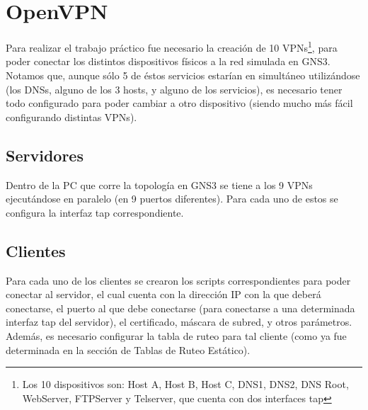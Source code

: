 \section{OpenVPN}
Para realizar el trabajo práctico fue necesario la creación de 10 VPNs\footnote{Los 10 dispositivos son: Host A, Host B, Host C, DNS1, DNS2, DNS Root, WebServer, FTPServer y Telserver, que cuenta con dos interfaces tap}, para poder conectar los distintos dispositivos físicos a la red simulada en GNS3. Notamos que, aunque sólo 5 de éstos servicios estarían en simultáneo utilizándose (los DNSs, alguno de los 3 hosts, y alguno de los servicios), es necesario tener todo configurado para poder cambiar a otro dispositivo (siendo mucho más fácil configurando distintas VPNs).

\subsection{Servidores}
Dentro de la PC que corre la topología en GNS3 se tiene a los 9 VPNs ejecutándose en paralelo (en 9 puertos diferentes). Para cada uno de estos se configura la interfaz tap correspondiente. 

\subsection{Clientes}
Para cada uno de los clientes se crearon los scripts correspondientes para poder conectar al servidor, el cual cuenta con la dirección IP con la que deberá conectarse, el puerto al que debe conectarse (para conectarse a una determinada interfaz tap del servidor), el certificado, máscara de subred, y otros parámetros. Además, es necesario configurar la tabla de ruteo para tal cliente (como ya fue determinada en la sección de Tablas de Ruteo Estático).